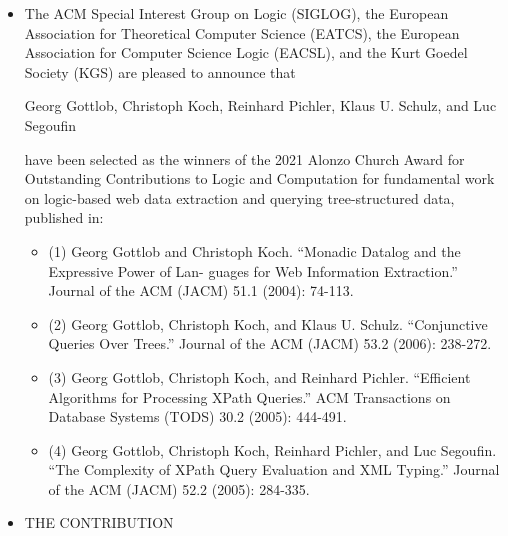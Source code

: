 \documentclass[prodmode,acmtecs]{acmsmall} %
\begin{document}
\begin{itemize}\item  The ACM Special Interest Group on Logic (SIGLOG), the European Association for Theoretical Computer Science (EATCS), the European Association for Computer Science Logic (EACSL), and the Kurt Goedel Society (KGS) are pleased to announce that 
 
  Georg Gottlob, Christoph Koch, Reinhard Pichler, Klaus U. Schulz, and Luc Segouﬁn 
 
  have been selected as the winners of the 2021 Alonzo Church Award for Outstanding Contributions to Logic and Computation for fundamental work on logic-based web data extraction and querying tree-structured data, published in: 
 
\begin{itemize}\item  (1) Georg Gottlob and Christoph Koch. “Monadic Datalog and the Expressive Power of Lan- guages for Web Information Extraction.” Journal of the ACM (JACM) 51.1 (2004): 74-113.
\item  (2) Georg Gottlob, Christoph Koch, and Klaus U. Schulz. “Conjunctive Queries Over Trees.” Journal of the ACM (JACM) 53.2 (2006): 238-272.
\item  (3) Georg Gottlob, Christoph Koch, and Reinhard Pichler. “Eﬃcient Algorithms for Processing XPath Queries.” ACM Transactions on Database Systems (TODS) 30.2 (2005): 444-491.
\item  (4) Georg Gottlob, Christoph Koch, Reinhard Pichler, and Luc Segouﬁn. “The Complexity of XPath Query Evaluation and XML Typing.” Journal of the ACM (JACM) 52.2 (2005): 284-335.
\end{itemize} 
\item  THE CONTRIBUTION 
 

\end{itemize}
\end{document}
